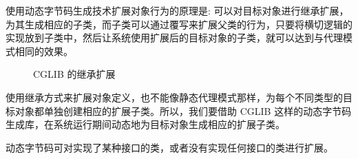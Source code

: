 使用动态字节码生成技术扩展对象行为的原理是: 可以对目标对象进行继承扩展，为其生成相应的子类，而子类可以通过覆写来扩展父类的行为，只要将横切逻辑的实现放到子类中，然后让系统使用扩展后的目标对象的子类，就可以达到与代理模式相同的效果。

\begin{figure}[H]
    \scriptsize
    \centering
    \caption{CGLIB 的继承扩展}
    \label{fig:CGLIB 的继承扩展}
\end{figure}

使用继承方式来扩展对象定义，也不能像静态代理模式那样，为每个不同类型的目标对象都单独创建相应的扩展子类。所以，我们要借助 CGLIB 这样的动态字节码生成库，在系统运行期间动态地为目标对象生成相应的扩展子类。

动态字节码可对实现了某种接口的类，或者没有实现任何接口的类进行扩展。

\newpage